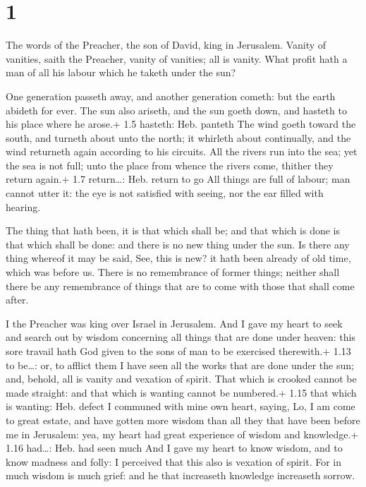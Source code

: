\hypertarget{section}{%
\section{1}\label{section}}

 The words of the Preacher, the son of David, king in
Jerusalem.  Vanity of vanities, saith the Preacher, vanity
of vanities; all is vanity.  What profit hath a man of all
his labour which he taketh under the sun?

 One generation passeth away, and another generation cometh:
but the earth abideth for ever.  The sun also ariseth, and
the sun goeth down, and hasteth to his place where he arose.+ 1.5
hasteth: Heb. panteth  The wind goeth toward the south, and
turneth about unto the north; it whirleth about continually, and the
wind returneth again according to his circuits.  All the
rivers run into the sea; yet the sea is not full; unto the place from
whence the rivers come, thither they return again.+ 1.7 return\ldots:
Heb. return to go  All things are full of labour; man cannot
utter it: the eye is not satisfied with seeing, nor the ear filled with
hearing.

 The thing that hath been, it is that which shall be; and
that which is done is that which shall be done: and there is no new
thing under the sun.  Is there any thing whereof it may be
said, See, this is new? it hath been already of old time, which was
before us.  There is no remembrance of former things;
neither shall there be any remembrance of things that are to come with
those that shall come after.

 I the Preacher was king over Israel in Jerusalem.
 And I gave my heart to seek and search out by wisdom
concerning all things that are done under heaven: this sore travail hath
God given to the sons of man to be exercised therewith.+ 1.13 to
be\ldots: or, to afflict them  I have seen all the works
that are done under the sun; and, behold, all is vanity and vexation of
spirit.  That which is crooked cannot be made straight: and
that which is wanting cannot be numbered.+ 1.15 that which is wanting:
Heb. defect  I communed with mine own heart, saying, Lo, I
am come to great estate, and have gotten more wisdom than all they that
have been before me in Jerusalem: yea, my heart had great experience of
wisdom and knowledge.+ 1.16 had\ldots: Heb. had seen much 
And I gave my heart to know wisdom, and to know madness and folly: I
perceived that this also is vexation of spirit.  For in
much wisdom is much grief: and he that increaseth knowledge increaseth
sorrow.

